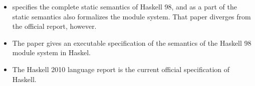 \begin{itemize}
    \item \citet{Faxen2002staticsemantics} specifies the complete static semantics of Haskell 98, and as a part of the static semantics also formalizes the module system.
     That paper diverges from the official report, however.
    \item The paper \citet{Diatchki2002haskellmodules} gives an executable specification of the semantics of the Haskell 98 module system in Haskel.
    \item The Haskell 2010 language report \citet{Haskell2010} is the current official specification of Haskell.
\end{itemize}